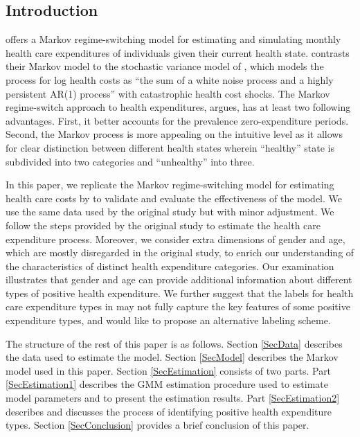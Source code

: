 \documentclass[letterpaper,12pt]{article}
\theoremstyle{definition}
\begin{document}
\begin{spacing}{1.5}{}

\section{Introduction}\label{SecIntro}

  \citet*{evans} offers a Markov regime-switching model for estimating and simulating monthly health care expenditures of individuals given their current health state. \citet{evans} contrasts their Markov model to the stochastic variance model of \citet{french}, which models the process for log health costs as ``the sum of a white noise process and a highly persistent AR(1) process'' with catastrophic health cost shocks. The Markov regime-switch approach to health expenditures, \citet{evans} argues, has at least two following advantages. First, it better accounts for the prevalence zero-expenditure periods. Second, the Markov process is more appealing on the intuitive level as it allows for clear distinction between different health states wherein ``healthy'' state is subdivided into two categories and ``unhealthy'' into three.\par
  
  In this paper, we replicate the Markov regime-switching model for estimating health care costs by \citet{evans} to validate and evaluate the effectiveness of the model. We use the same data used by the original study but with minor adjustment. We follow the steps provided by the original study to estimate the health care expenditure process. Moreover, we consider extra dimensions of gender and age, which are mostly disregarded in the original study, to enrich our understanding of the characteristics of distinct health expenditure categories. Our examination illustrates that gender and age can provide additional information about different types of positive health expenditure. We further suggest that the labels for health care expenditure types in \citet{evans} may not fully capture the key features of some positive expenditure types, and would like to propose an alternative labeling scheme.\par 
   
  The structure of the rest of this paper is as follows. Section \ref{SecData} describes the data used to estimate the model. Section \ref{SecModel} describes the Markov model used in this paper. Section \ref{SecEstimation} consists of two parts. Part \ref{SecEstimation1} describes the GMM estimation procedure used to estimate model parameters and to present the estimation results. Part \ref{SecEstimation2} describes and discusses the process of identifying positive health expenditure types. Section \ref{SecConclusion} provides a brief conclusion of this paper.  



\end{spacing}
\end{document}
